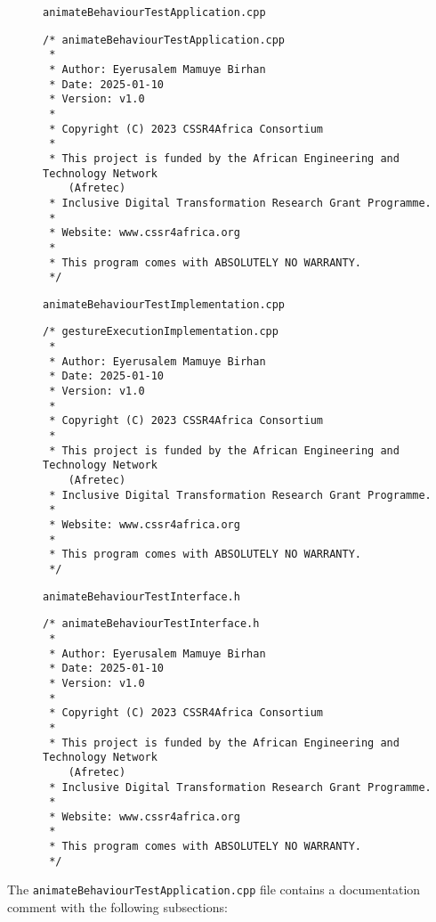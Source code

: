 \documentclass{CSSRforAfrica}
\newcommand{\blank}{~\\}
\newcommand{\checkboxChecked}{\fbox{\ding{51}}} %
\begin{document}
\begin{description}

\item[\checkboxChecked] {\small \verb+animateBehaviourTestApplication.cpp+}  
{\small \begin{verbatim}
/* animateBehaviourTestApplication.cpp
 *
 * Author: Eyerusalem Mamuye Birhan
 * Date: 2025-01-10
 * Version: v1.0
 * 
 * Copyright (C) 2023 CSSR4Africa Consortium
 * 
 * This project is funded by the African Engineering and Technology Network 
    (Afretec) 
 * Inclusive Digital Transformation Research Grant Programme. 
 *
 * Website: www.cssr4africa.org
 *
 * This program comes with ABSOLUTELY NO WARRANTY.
 */
\end{verbatim} }

\newpage
\item[\checkboxChecked]  {\small \verb+animateBehaviourTestImplementation.cpp+}  
{\small \begin{verbatim}
/* gestureExecutionImplementation.cpp
 *
 * Author: Eyerusalem Mamuye Birhan
 * Date: 2025-01-10
 * Version: v1.0
 * 
 * Copyright (C) 2023 CSSR4Africa Consortium
 * 
 * This project is funded by the African Engineering and Technology Network 
    (Afretec) 
 * Inclusive Digital Transformation Research Grant Programme. 
 *
 * Website: www.cssr4africa.org
 *
 * This program comes with ABSOLUTELY NO WARRANTY.
 */
\end{verbatim} }

\item[\checkboxChecked] {\small \verb+animateBehaviourTestInterface.h+}   
{\small \begin{verbatim}
/* animateBehaviourTestInterface.h
 *
 * Author: Eyerusalem Mamuye Birhan
 * Date: 2025-01-10
 * Version: v1.0
 * 
 * Copyright (C) 2023 CSSR4Africa Consortium
 * 
 * This project is funded by the African Engineering and Technology Network 
    (Afretec) 
 * Inclusive Digital Transformation Research Grant Programme. 
 *
 * Website: www.cssr4africa.org
 *
 * This program comes with ABSOLUTELY NO WARRANTY.
 */
\end{verbatim} }


\end{description} 
%
\noindent The {\small \verb+animateBehaviourTestApplication.cpp+} file contains a documentation comment with the following subsections:
\end{document}
